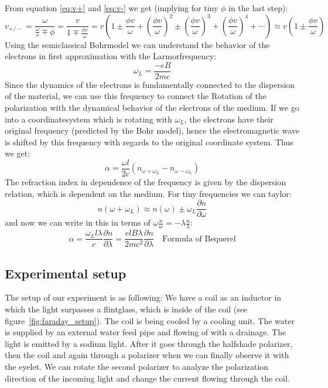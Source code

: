 From equation \eqref{eq:v+} and \eqref{eq:v-} we get (implying for tiny $\phi$ in the last step):
\begin{equation}
v_{+/-} = \frac{\omega}{\frac{\omega}{v} \mp \phi} = \frac{v}{1 \mp \frac{\phi v}{\omega}} 
= v \left ( 1 \pm \frac{\phi v}{\omega}+ \left (\frac{\phi v}{\omega} \right)^2
\pm \left (\frac{\phi v}{\omega} \right)^3 + \left (\frac{\phi v}{\omega} \right)^4+ \cdots \right)
\approx v \left  (1 \pm \frac{\phi v}{\omega} \right )
\end{equation}
Using the semiclassical Bohrmodel we can understand the behavior of the electrons in 
first approximation with the Larmorfrequency:
\begin{equation}
\omega_L = \frac{-e B}{2 m c}
\end{equation}
Since the dynamics of the electrons is fundamentally connected to the dispersion of the material,
we can use this frequency to connect the Rotation of the polarization with the dynamical behavior 
of the electrons of the medium. If we go into a coordinatesystem which is rotating with $\omega_L$,
the electrons have their original frequency (predicted by the Bohr model), hence the electromagnetic
wave is shifted by this frequency with regards to the original coordinate system. Thus we get:
\begin{equation}
\alpha = \frac{\omega l}{2c} \left (n_{\omega + \omega_L} - n_{\omega - \omega_L}\right )  
\end{equation}
The refraction index in dependence of the frequency is given by the dispersion relation, which is 
dependent on the medium. For tiny frequencies we can taylor: 
\begin{equation}
n(\omega + \omega_L) \approx n(\omega) \pm \omega_L \frac{\partial n}{\partial \omega}
\end{equation}
and now we can write in this in terms of $\omega \frac{n}{w} = -\lambda \frac{n}{\lambda}$:
\begin{equation}
\alpha = \frac{\omega_L l \lambda}{c} \frac{\partial n}{\partial \lambda} = 
\frac{e l B \lambda}{2m c^2} \frac{\partial n}{\partial \lambda} \quad \text{Formula of Bequerel}
\end{equation}


\subsection{Experimental setup}
The setup of our experiment is as following: We have a coil as an inductor in which the light
surpasses a flintglass, which is inside of the coil (see figure~\ref{fig:faraday_setup}). The
coil is being cooled by a cooling unit. The water is supplied by an external  water feed pipe
and flowing of with a drainage. The light is emitted by a sodium light. After it goes through
the halfshade polarizer, then the coil and again through a polarizer when we can finally 
observe it with the eyelet. We can rotate the second polarizer 
to analyze the polarization direction of the incoming light and change the current flowing through
the coil.

